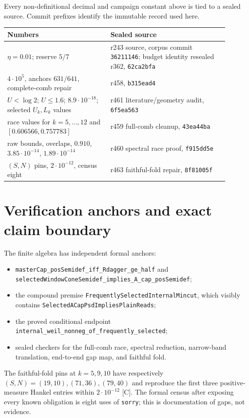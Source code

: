 \documentclass[11pt]{article}
\newcommand{\Cgrade}{\textnormal{\small[C]}}
\newcommand{\code}[1]{\nolinkurl{#1}}
\begin{document}
Every non-definitional decimal and campaign constant above is tied
to a sealed source.  Commit prefixes identify the immutable record
used here.
\begin{center}
\small
\begin{tabular}{@{}p{0.42\linewidth}p{0.48\linewidth}@{}}
\toprule
Numbers & Sealed source\\
\midrule
$\eta=0.01$; reserve $5/7$ &
r243 source, corpus commit \texttt{36211146};
budget identity resealed r362, \texttt{62ca2bfa}\\
$4\cdot10^5$, anchors $631/641$, complete-comb repair &
r458, \texttt{b315ead4}\\
$U<\log2$; $U\le1.6$; $8.9\cdot10^{-18}$;
selected $U_k,L_k$ values &
r461 literature/geometry audit, \texttt{6f5ea563}\\
race values for $k=5,\ldots,12$ and
$[0.606566,0.757783]$ &
r459 full-comb cleanup, \texttt{43ea44ba}\\
raw bounds, overlaps, $0.910$, $3.85\cdot10^{-14}$,
$1.89\cdot10^{-14}$ &
r460 spectral race proof, \texttt{f915dd5e}\\
$(S,N)$ pins, $2\cdot10^{-12}$, census eight &
r463 faithful-fold repair, \texttt{8f81005f}\\
\bottomrule
\end{tabular}
\end{center}

\section{Verification anchors and exact claim boundary}

The finite algebra has independent formal anchors:
\begin{itemize}
\item \code{masterCap_posSemidef_iff_Rdagger_ge_half} and
\code{selectedWindowConeSemidef_implies_A_cap_posSemidef};
\item the compound premise
\code{FrequentlySelectedInternalMincut}, which visibly contains
\code{SelectedACapPsdImpliesPlainReads};
\item the proved conditional endpoint
\code{internal_weil_nonneg_of_frequently_selected};
\item sealed checkers for the full-comb race, spectral reduction,
narrow-band translation, end-to-end gap map, and faithful fold.
\end{itemize}
The faithful-fold pins at $k=5,9,10$ have respectively
$(S,N)=(19,10),(71,36),(79,40)$ and reproduce the first three
positive-measure Hankel entries within $2\cdot10^{-12}$ \Cgrade.
The formal census after exposing every known obligation is eight
uses of \code{sorry}; this is documentation of gaps, not evidence.
\end{document}
